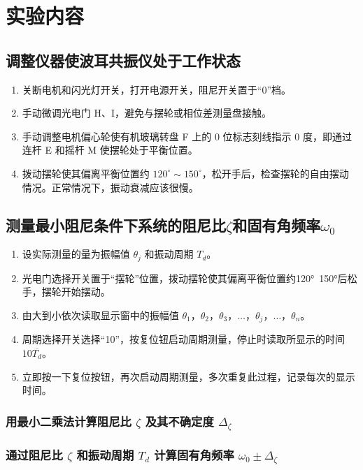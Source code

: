 \documentclass[12pt,a4paper]{amsart}
\begin{document}
\section{实验内容}

\subsection{调整仪器使波耳共振仪处于工作状态}

\begin{enumerate}
	\item 关断电机和闪光灯开关，打开电源开关，阻尼开关置于“0”档。
	\item 手动微调光电门 H、I，避免与摆轮或相位差测量盘接触。
	\item 手动调整电机偏心轮使有机玻璃转盘 F 上的 0 位标志刻线指示 0 度，即通过连杆 E 和摇杆 M 使摆轮处于平衡位置。
	\item 拨动摆轮使其偏离平衡位置约 $120^\circ\sim 150^\circ$，松开手后，检查摆轮的自由摆动情况。正常情况下，振动衰减应该很慢。
    
\end{enumerate}

\subsection{测量最小阻尼条件下系统的阻尼比$\zeta$和固有角频率$\omega_0$}
\begin{enumerate}
    \item 设实际测量的量为振幅值 $\theta_j$ 和振动周期 $T_d$。
	\item 光电门选择开关置于“摆轮”位置，拨动摆轮使其偏离平衡位置约120°~150°后松手，摆轮开始摆动。
    \item 由大到小依次读取显示窗中的振幅值 $\theta_1$，$\theta_2$，$\theta_3$，$\dots$，$\theta_j$，$\dots$，$\theta_n$。
    \item 周期选择开关选择“10”，按复位钮启动周期测量，停止时读取所显示的时间 $10\overline{T_d}$。
    \item 立即按一下复位按钮，再次启动周期测量，多次重复此过程，记录每次的显示时间。
\end{enumerate}

\subsubsection{用最小二乘法计算阻尼比 $\zeta$ 及其不确定度 $\Delta_\zeta$}

\subsubsection{通过阻尼比 $\zeta$ 和振动周期 $T_d$ 计算固有角频率 $\omega_0\pm\Delta_\zeta$}
\end{document}
